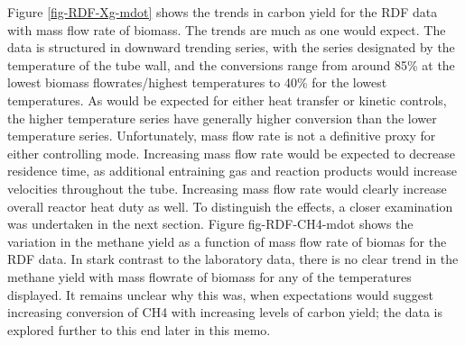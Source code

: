 \documentclass[11pt,twocolumn]{article}
\begin{document}
Figure \ref{fig-RDF-Xg-mdot} shows the trends in carbon yield for the RDF data with mass flow rate of biomass.  The trends are much as one would expect.  The data is structured in downward trending series, with the series designated by the temperature of the tube wall, and the conversions range from around 85\% at the lowest biomass flowrates/highest temperatures to 40\% for the lowest temperatures.  As would be expected for either heat transfer or kinetic controls, the higher temperature series have generally higher conversion than the lower temperature series.  Unfortunately, mass flow rate is not a definitive proxy for either controlling mode.  Increasing mass flow rate would be expected to decrease residence time, as additional entraining gas and reaction products would increase velocities throughout the tube.  Increasing mass flow rate would clearly increase overall reactor heat duty as well.  To distinguish the effects, a closer examination was undertaken in the next section.  Figure {fig-RDF-CH4-mdot} shows the variation in the methane yield as a function of mass flow rate of biomas for the RDF data.  In stark contrast to the laboratory data, there is no clear trend in the methane yield with mass flowrate of biomass for any of the temperatures displayed.  It remains unclear why this was, when expectations would suggest increasing conversion of CH4 with increasing levels of carbon yield; the data is explored further to this end later in this memo.  
\end{document}
